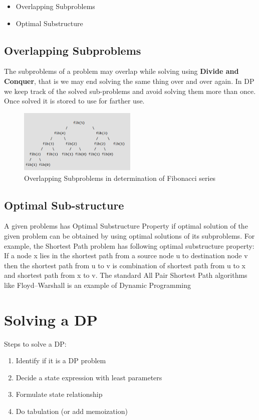 \documentclass[12pt]{article}
\begin{document}
\begin{itemize}
	\item Overlapping Subproblems
	\item Optimal Substructure
\end{itemize}

\subsection{Overlapping Subproblems}
The subproblems of a problem may overlap while solving using \textbf{Divide and Conquer}, that is we may end solving the same thing over and over again. In DP we keep track of the solved sub-problems and avoid solving them more than once. Once solved it is stored to use for farther use.
\begin{figure}[H]
	\centering
	\captionsetup{justification=centering}
	\includegraphics[width = 0.5\textwidth]{image/overlap.png}
	\caption{
		Overlapping Subproblems in determination of Fibonacci series
	}
	\label{fig:fib}
	
\end{figure}

\subsection{Optimal Sub-structure}
 A given problems has Optimal Substructure Property if optimal solution of the given problem can be obtained by using optimal solutions of its subproblems.
For example, the Shortest Path problem has following optimal substructure property:
If a node x lies in the shortest path from a source node u to destination node v then the shortest path from u to v is combination of shortest path from u to x and shortest path from x to v. The standard All Pair Shortest Path algorithms like Floyd–Warshall is an example of Dynamic Programming

\section{Solving a DP}
Steps to solve a DP:
	\begin{enumerate}
		\item Identify if it is a DP problem
		\item Decide a state expression with least parameters
		\item Formulate state relationship    
		\item Do tabulation (or add memoization)
		
	\end{enumerate}
\end{document}
